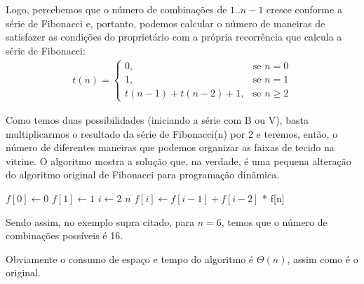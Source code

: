 \begin{figure}[!h]
\label{fig:6.21-1}
\end{figure}

Logo, percebemos que o número de combinações de $1..n-1$ cresce conforme a série de Fibonacci e, portanto, podemos calcular o número de maneiras de satisfazer as condições do proprietário com a própria recorrência que calcula a série de Fibonacci:
\begin{align*}
t(n) = \left\{\begin{array}{rl}
                    0, &\mbox{se $n = 0$} \\
                    1, &\mbox{se $n = 1$} \\
                    t(n - 1) + t(n - 2) + 1, &\mbox{se $n \geq 2$}
                \end{array} \right.
\end{align*}

Como temos duas possibilidades (iniciando a série com B ou V), basta multiplicarmos o resultado da série de Fibonacci(n) por 2 e teremos, então, o número de diferentes maneiras que podemos organizar as faixas de tecido na vitrine. O algoritmo  mostra a solução que, na verdade, é uma pequena alteração do algoritmo original de Fibonacci para programação dinâmica.

\begin{codebox}
\li $f[0] \gets 0$
\li $f[1] \gets 1$
\li \For $i \gets 2$ \To $n$
\li \Do
        $f[i] \gets f[i-1] + f[i-2]$
    \End
\li {} * f[n]
\end{codebox}

Sendo assim, no exemplo supra citado, para $n = 6$, temos que o número de combinações possíveis é 16.

Obviamente o consumo de espaço e tempo do algoritmo é $\Theta(n)$, assim como é o original.